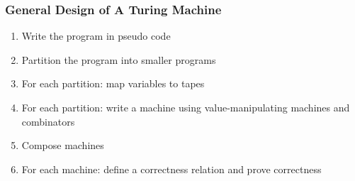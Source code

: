 \documentclass{beamer} %
\begin{document}
\begin{frame}
  \frametitle{General Design of A Turing Machine}
  \begin{enumerate}
  \item Write the program in pseudo code
  \item Partition the program into smaller programs
  \item For each partition: map variables to tapes
  \item For each partition: write a machine using value-manipulating machines and combinators
  \item Compose machines
  \item For each machine: define a correctness relation and prove correctness
  \end{enumerate}
\end{frame}
\end{document}
